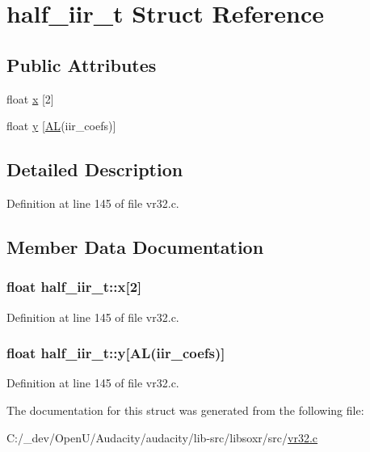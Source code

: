\hypertarget{structhalf__iir__t}{}\section{half\+\_\+iir\+\_\+t Struct Reference}
\label{structhalf__iir__t}
\subsection*{Public Attributes}
\begin{DoxyCompactItemize}
\item 
float \hyperlink{structhalf__iir__t_a0a06764cce3749654a71f69f28a78eee}{x} \mbox{[}2\mbox{]}
\item 
float \hyperlink{structhalf__iir__t_aa2686a66c7c93d35103da8c0519204a9}{y} \mbox{[}\hyperlink{libsoxr_2src_2internal_8h_acbb4b45d300db3bd8b1f364083e80c1d}{AL}(iir\+\_\+coefs)\mbox{]}
\end{DoxyCompactItemize}


\subsection{Detailed Description}


Definition at line 145 of file vr32.\+c.



\subsection{Member Data Documentation}
\subsubsection[{\texorpdfstring{x}{x}}]{\setlength{\rightskip}{0pt plus 5cm}float half\+\_\+iir\+\_\+t\+::x\mbox{[}2\mbox{]}}\hypertarget{structhalf__iir__t_a0a06764cce3749654a71f69f28a78eee}{}\label{structhalf__iir__t_a0a06764cce3749654a71f69f28a78eee}


Definition at line 145 of file vr32.\+c.

\subsubsection[{\texorpdfstring{y}{y}}]{\setlength{\rightskip}{0pt plus 5cm}float half\+\_\+iir\+\_\+t\+::y\mbox{[}{\bf AL}(iir\+\_\+coefs)\mbox{]}}\hypertarget{structhalf__iir__t_aa2686a66c7c93d35103da8c0519204a9}{}\label{structhalf__iir__t_aa2686a66c7c93d35103da8c0519204a9}


Definition at line 145 of file vr32.\+c.



The documentation for this struct was generated from the following file\+:\begin{DoxyCompactItemize}
\item 
C\+:/\+\_\+dev/\+Open\+U/\+Audacity/audacity/lib-\/src/libsoxr/src/\hyperlink{vr32_8c}{vr32.\+c}\end{DoxyCompactItemize}
